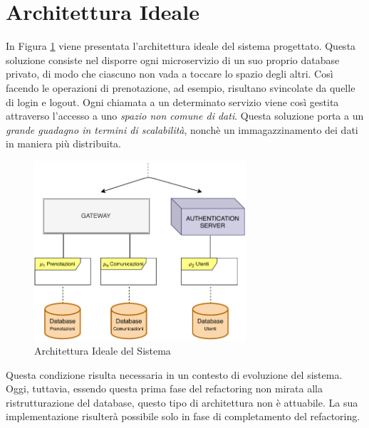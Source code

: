 \section{Architettura Ideale}
In Figura \ref{fig:idealarchitecture} viene presentata l'architettura ideale del sistema progettato. Questa soluzione consiste nel disporre ogni microservizio di un suo proprio database privato, di modo che ciascuno non vada a toccare lo spazio degli altri. Così facendo le operazioni di prenotazione, ad esempio, risultano svincolate da quelle di login e logout. Ogni chiamata a un determinato servizio viene così gestita attraverso l'accesso a uno \emph{spazio non comune di dati}. Questa soluzione porta a un \textit{grande guadagno in termini di scalabilità}, nonchè un immagazzinamento dei dati in maniera più distribuita. 
\begin{figure}[H]
    \centering
    \includegraphics[width=0.70\textwidth]{images/02_7_ideal_architecture.pdf}
    \caption{Architettura Ideale del Sistema}
    \label{fig:idealarchitecture}
\end{figure}
Questa condizione risulta necessaria in un contesto di evoluzione del sistema. Oggi, tuttavia, essendo questa prima fase del refactoring non mirata alla ristrutturazione del database, questo tipo di architettura non è attuabile. La sua implementazione risulterà possibile solo in fase di completamento del refactoring.